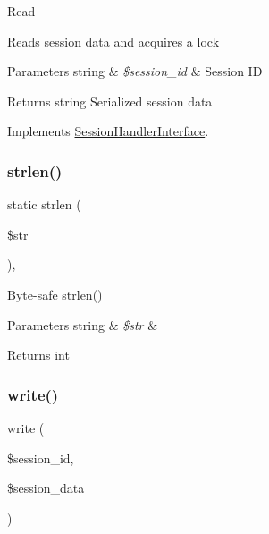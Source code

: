 Read

Reads session data and acquires a lock


\begin{DoxyParams}[1]{Parameters}
string & {\em \$session\+\_\+id} & Session ID \\
\hline
\end{DoxyParams}
\begin{DoxyReturn}{Returns}
string Serialized session data 
\end{DoxyReturn}


Implements \mbox{\hyperlink{interface_session_handler_interface_a5bbf84ebf657be4eaccc0582377c76bf}{Session\+Handler\+Interface}}.

\mbox{\label{class_c_i___session__files__driver_a4c29a687d4ed62c26a10e41d98930d5f}} 
\subsubsection{\texorpdfstring{strlen()}{strlen()}}
{\footnotesize\ttfamily static strlen (\begin{DoxyParamCaption}\item[{}]{\$str }\end{DoxyParamCaption})\hspace{0.3cm}{\ttfamily [static]}, {\ttfamily [protected]}}

Byte-\/safe \mbox{\hyperlink{class_c_i___session__files__driver_a4c29a687d4ed62c26a10e41d98930d5f}{strlen()}}


\begin{DoxyParams}[1]{Parameters}
string & {\em \$str} & \\
\hline
\end{DoxyParams}
\begin{DoxyReturn}{Returns}
int 
\end{DoxyReturn}
\mbox{\label{class_c_i___session__files__driver_ad9d124885be93668f1dbf6aace5964f5}} 
\subsubsection{\texorpdfstring{write()}{write()}}
{\footnotesize\ttfamily write (\begin{DoxyParamCaption}\item[{}]{\$session\+\_\+id,  }\item[{}]{\$session\+\_\+data }\end{DoxyParamCaption})}

